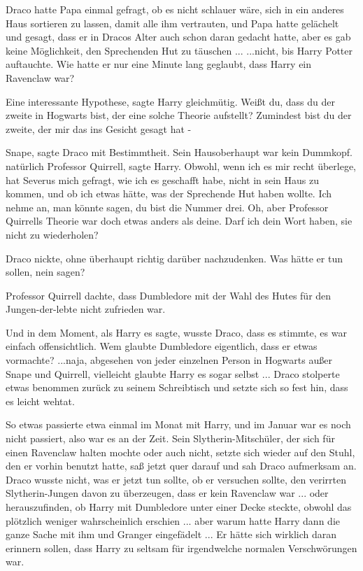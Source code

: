 Draco hatte Papa einmal gefragt, ob es nicht schlauer wäre, sich in ein anderes
Haus sortieren zu lassen, damit alle ihm vertrauten, und Papa hatte gelächelt
und gesagt, dass er in Dracos Alter auch schon daran gedacht hatte, aber es gab
keine Möglichkeit, den Sprechenden Hut zu täuschen ... ...nicht, bis Harry Potter
auftauchte. Wie hatte er nur eine Minute lang geglaubt, dass Harry ein Ravenclaw
war?

\glqq{}Eine interessante Hypothese\grqq{}, sagte Harry gleichmütig. \glqq{}Weißt
du, dass du der zweite in Hogwarts bist, der eine solche Theorie aufstellt?
Zumindest bist du der zweite, der mir das ins Gesicht gesagt hat -\grqq{}

\glqq{}Snape\grqq{}, sagte Draco mit Bestimmtheit. Sein Hausoberhaupt war kein
Dummkopf. \glqq{}natürlich Professor Quirrell\grqq{}, sagte Harry. \glqq{}Obwohl,
wenn ich es mir recht überlege, hat Severus mich gefragt, wie ich es geschafft
habe, nicht in sein Haus zu kommen, und ob ich etwas hätte, was der Sprechende
Hut haben wollte. Ich nehme an, man könnte sagen, du bist die Nummer drei. Oh,
aber Professor Quirrells Theorie war doch etwas anders als deine. Darf ich dein
Wort haben, sie nicht zu wiederholen?\grqq{}

Draco nickte, ohne überhaupt richtig darüber nachzudenken. Was hätte er tun
sollen, nein sagen?

\glqq{}Professor Quirrell dachte, dass Dumbledore mit der Wahl des Hutes für den
Jungen-der-lebte nicht zufrieden war.\grqq{}

Und in dem Moment, als Harry es sagte, wusste Draco, dass es stimmte, es war
einfach offensichtlich. Wem glaubte Dumbledore eigentlich, dass er etwas
vormachte? ...naja, abgesehen von jeder einzelnen Person in Hogwarts außer Snape
und Quirrell, vielleicht glaubte Harry es sogar selbst ... Draco stolperte etwas
benommen zurück zu seinem Schreibtisch und setzte sich so fest hin, dass es
leicht wehtat.

So etwas passierte etwa einmal im Monat mit Harry, und im Januar war es noch
nicht passiert, also war es an der Zeit. Sein Slytherin-Mitschüler, der sich für
einen Ravenclaw halten mochte oder auch nicht, setzte sich wieder auf den Stuhl,
den er vorhin benutzt hatte, saß jetzt quer darauf und sah Draco aufmerksam an.
Draco wusste nicht, was er jetzt tun sollte, ob er versuchen sollte, den
verirrten Slytherin-Jungen davon zu überzeugen, dass er kein Ravenclaw war ...
oder herauszufinden, ob Harry mit Dumbledore unter einer Decke steckte, obwohl
das plötzlich weniger wahrscheinlich erschien ... aber warum hatte Harry dann die
ganze Sache mit ihm und Granger eingefädelt ... Er hätte sich wirklich daran
erinnern sollen, dass Harry zu seltsam für irgendwelche normalen Verschwörungen
war.

